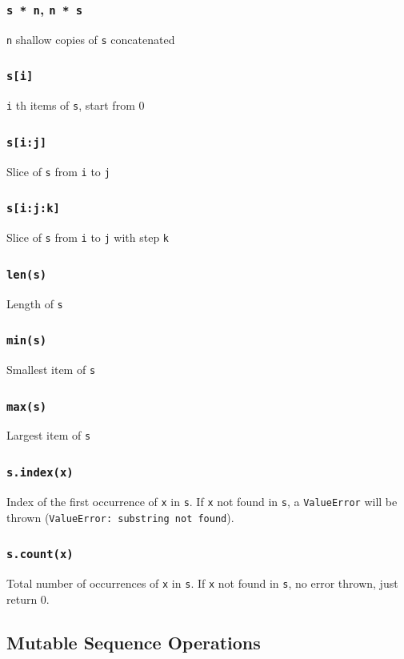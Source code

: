 \documentclass[12pt]{book}
\begin{document}
\subsubsection{\texttt{s * n}, \texttt{n * s}}
\label{sec:orgef7382a}
\texttt{n} shallow copies of \texttt{s} concatenated
\subsubsection{\texttt{s[i]}}
\label{sec:org57e1635}
\texttt{i} th items of \texttt{s}, start from 0
\subsubsection{\texttt{s[i:j]}}
\label{sec:org89e30d4}
Slice of \texttt{s} from \texttt{i} to \texttt{j}
\subsubsection{\texttt{s[i:j:k]}}
\label{sec:orgce4e58a}
Slice of \texttt{s} from \texttt{i} to \texttt{j} with step \texttt{k}
\subsubsection{\texttt{len(s)}}
\label{sec:orgf56b09b}
Length of \texttt{s}
\subsubsection{\texttt{min(s)}}
\label{sec:org727b1cc}
Smallest item of \texttt{s}
\subsubsection{\texttt{max(s)}}
\label{sec:orgd04e72f}
Largest item of \texttt{s}
\subsubsection{\texttt{s.index(x)}}
\label{sec:org24170f7}
Index of the first occurrence of \texttt{x} in \texttt{s}. If \texttt{x} not found in \texttt{s}, a \texttt{ValueError} will be thrown (\texttt{ValueError: substring not found}).
\subsubsection{\texttt{s.count(x)}}
\label{sec:org11e61e4}
Total number of occurrences of \texttt{x} in \texttt{s}. If \texttt{x} not found in \texttt{s}, no error thrown, just return 0.
\subsection{Mutable Sequence Operations}
\label{sec:orgf1c6788}
\end{document}
